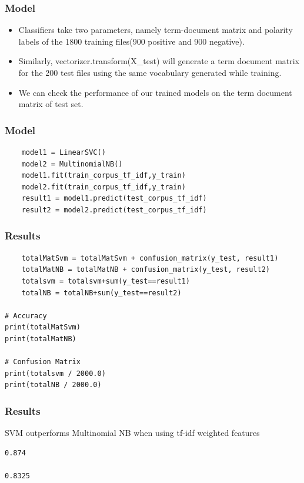 \begin{frame}[fragile]\frametitle{Model}
  \begin{itemize}
  \item  Classifiers take two parameters, namely term-document matrix and polarity labels of the 1800 training files(900 positive and 900 negative). 
  \item  Similarly, vectorizer.transform(X\_test) will generate a term document matrix for the 200 test files using the same vocabulary generated while training. 
  \item We can check the performance of our trained models on the term document matrix of test set. 
  \end{itemize}
\end{frame}


\begin{frame}[fragile]\frametitle{Model}
    \begin{lstlisting}
    model1 = LinearSVC()
    model2 = MultinomialNB()    
    model1.fit(train_corpus_tf_idf,y_train)
    model2.fit(train_corpus_tf_idf,y_train)
    result1 = model1.predict(test_corpus_tf_idf)
    result2 = model2.predict(test_corpus_tf_idf)
    \end{lstlisting}
\end{frame}

\begin{frame}[fragile]\frametitle{Results}
    \begin{lstlisting}
    totalMatSvm = totalMatSvm + confusion_matrix(y_test, result1)
    totalMatNB = totalMatNB + confusion_matrix(y_test, result2)
    totalsvm = totalsvm+sum(y_test==result1)
    totalNB = totalNB+sum(y_test==result2)
    
# Accuracy
print(totalMatSvm)
print(totalMatNB)

# Confusion Matrix
print(totalsvm / 2000.0)
print(totalNB / 2000.0)
    \end{lstlisting}
\end{frame}

\begin{frame}[fragile]\frametitle{Results}
SVM outperforms Multinomial NB when using tf-idf weighted features
    \begin{lstlisting}
0.874

0.8325
    \end{lstlisting}
\end{frame}


